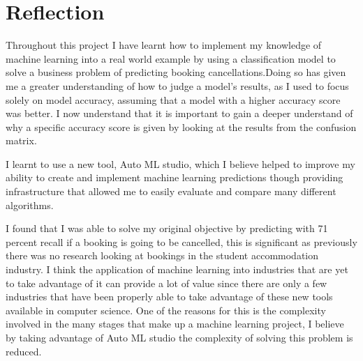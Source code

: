 \chapter{Reflection}
\label{ch:reflection}
Throughout this project I have learnt how to implement my knowledge of machine learning into a real world example by using a classification model to solve a business problem of predicting booking cancellations.Doing so has given me a greater understanding of how to judge a model's results, as I used to focus solely on model accuracy, assuming that a model with a higher accuracy score was better. I now understand that it is important to gain a deeper understand of why a specific accuracy score is given by looking at the results from the confusion matrix.

I learnt to use a new tool, Auto ML studio, which I believe helped to improve my ability to create and implement machine learning predictions though providing infrastructure that allowed me to easily evaluate and compare many different algorithms.

I found that I was able to solve my original objective by predicting with 71 percent recall if a booking is going to be cancelled, this is significant as previously there was no research looking at bookings in the student accommodation industry. I think the application of machine learning into industries that are yet to take advantage of it can provide a lot of value since there are only a few industries that have been properly able to take advantage of these new tools available in computer science. One of the reasons for this is the complexity involved in the many stages that make up a machine learning project, I believe by taking advantage of Auto ML studio the complexity of solving this problem is reduced. 
